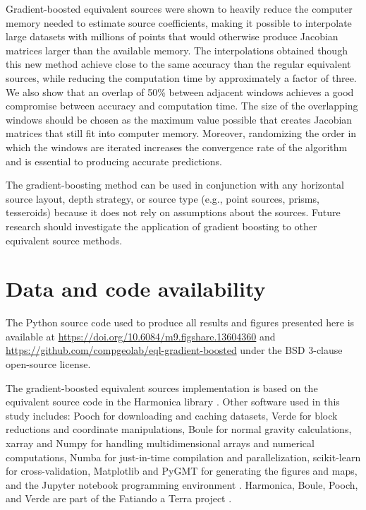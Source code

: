 Gradient-boosted equivalent sources were shown to heavily reduce the computer
memory needed to estimate source coefficients, making it possible to
interpolate large datasets with millions of points that would otherwise produce
Jacobian matrices larger than the available memory.
The interpolations obtained though this new method achieve close to the same
accuracy than the regular equivalent sources, while reducing the computation
time by approximately a factor of three.
We also show that an overlap of 50\% between adjacent windows achieves a good
compromise between accuracy and computation time.
The size of the overlapping windows should be chosen as the maximum value
possible that creates Jacobian matrices that still fit into computer memory.
Moreover, randomizing the order in which the windows are iterated increases the
convergence rate of the algorithm and is essential to producing accurate
predictions.

The gradient-boosting method can be used in conjunction with any horizontal
source layout, depth strategy, or source type (e.g., point sources, prisms,
tesseroids) because it does not rely on assumptions about the sources.
Future research should investigate the application of gradient boosting to
other equivalent source methods.


\section{Data and code availability}

The Python source code used to produce all results and figures presented here
is available at
\url{https://doi.org/10.6084/m9.figshare.13604360} and
\url{https://github.com/compgeolab/eql-gradient-boosted}
under the BSD 3-clause open-source license.

The gradient-boosted equivalent sources implementation is based on the
equivalent source code in the Harmonica library \citep{harmonica2020}.
Other software used in this study includes:
Pooch \citep{pooch2020} for downloading and caching datasets,
Verde \citep{verde2018} for block reductions and coordinate manipulations,
Boule \citep{boule2020} for normal gravity calculations,
xarray \citep{xarray2017} and Numpy \citep{numpy2020} for handling
multidimensional arrays and numerical computations,
Numba \citep{numba2015} for just-in-time compilation and parallelization,
scikit-learn \citep{sklearn2011} for cross-validation,
Matplotlib \citep{matplotlib2007} and PyGMT \citep{pygmt2020} for generating
the figures and maps,
and the Jupyter notebook programming environment \citep{jupyter2016}.
Harmonica, Boule, Pooch, and Verde are part of the Fatiando a Terra project
\citep{fatiando2013}.

